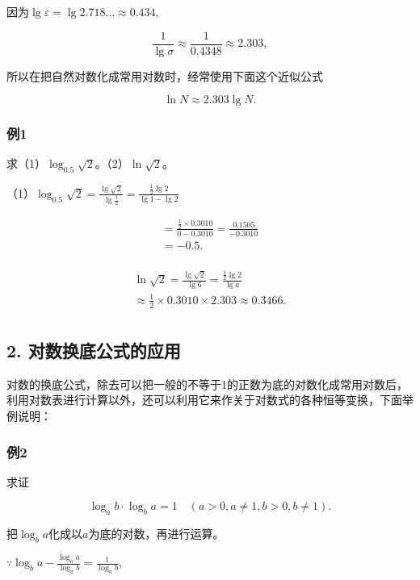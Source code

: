 因为\(\lg \varepsilon = \lg 2.718\dots \approx 0.434,\)

\[
\frac{1}{\lg \sigma} \approx \frac{1}{0.4348} \approx 2.303,
\]

所以在把自然对数化成常用对数时，经常使用下面这个近似公式

\[
\ln N \approx 2.303 \lg N.
\]

\subsubsection{例1}

求（1）\(\log_{0.5}\sqrt{2}\)。（2）\(\ln \sqrt{2}\)。

（1）\(\log_{0.5}\sqrt{2} = \frac{\lg\sqrt{2}}{\lg\frac{1}{2}} = \frac{\frac{1}{2}\lg 2}{\lg 1 - \lg 2}\)

\[
\begin{array}{l} = \frac{\frac{1}{2} \times 0.3010}{0 - 0.3010} = \frac{0.1505}{- 0.3010} \\ = - 0.5. \\ \end{array}
\]

\[
\begin{array}{l} \ln \sqrt{2} = \frac{\lg \sqrt{2}}{\lg 6} = \frac{\frac{1}{2} \lg 2}{\lg a} \tag {2} \\ \approx \frac{1}{2} \times 0.3010 \times 2.303 \approx 0.3466. \\ \end{array}
\]

\subsection{2. 对数换底公式的应用}

对数的换底公式，除去可以把一般的不等于1的正数为底的对数化成常用对数后，利用对数表进行计算以外，还可以利用它来作关于对数式的各种恒等变换，下面举例说明：

\subsubsection{例2}

求证

\[
\log_{a} b \cdot \log_{b} a = 1 \quad (a > 0, a \neq 1, b > 0, b \neq 1).
\]

 把\(\log_b a\)化成以\(a\)为底的对数，再进行运算。

\(\because \log_{b}a - \frac{\log_{a}a}{\log_{a}b} = \frac{1}{\log_{a}b},\)

